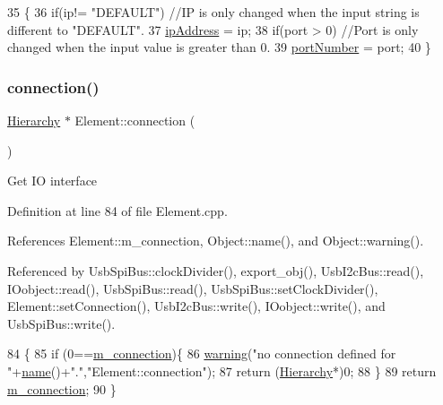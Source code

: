 \begin{DoxyCode}
35 \{
36     \textcolor{keywordflow}{if}(ip!= \textcolor{stringliteral}{"DEFAULT"})                                                              \textcolor{comment}{//IP is only changed
       when the input string is different to "DEFAULT".}
37         \hyperlink{classMSOxxxx_aa55bdb0feb799b195628fe6ef0222b62}{ipAddress} = ip;  
38     \textcolor{keywordflow}{if}(port > 0)                                                                            \textcolor{comment}{//Port is only
       changed when the input value is greater than 0.}
39         \hyperlink{classMSOxxxx_a242bcf72c701cd20d86d25315fc6180f}{portNumber} = port;
40 \}
\end{DoxyCode}
\mbox{\label{classElement_af57444353c1ddf9fa0109801e97debf7}} 
\subsubsection{\texorpdfstring{connection()}{connection()}}
{\footnotesize\ttfamily \hyperlink{classHierarchy}{Hierarchy} $\ast$ Element\+::connection (\begin{DoxyParamCaption}{ }\end{DoxyParamCaption})\hspace{0.3cm}{\ttfamily [inherited]}}

Get IO interface 

Definition at line 84 of file Element.\+cpp.



References Element\+::m\+\_\+connection, Object\+::name(), and Object\+::warning().



Referenced by Usb\+Spi\+Bus\+::clock\+Divider(), export\+\_\+obj(), Usb\+I2c\+Bus\+::read(), I\+Oobject\+::read(), Usb\+Spi\+Bus\+::read(), Usb\+Spi\+Bus\+::set\+Clock\+Divider(), Element\+::set\+Connection(), Usb\+I2c\+Bus\+::write(), I\+Oobject\+::write(), and Usb\+Spi\+Bus\+::write().


\begin{DoxyCode}
84                               \{
85   \textcolor{keywordflow}{if} (0==\hyperlink{classElement_abe3de7a5dbbc9a6dd2d7e012e5fdb266}{m\_connection})\{
86     \hyperlink{classObject_a65cd4fda577711660821fd2cd5a3b4c9}{warning}(\textcolor{stringliteral}{"no connection defined for "}+\hyperlink{classObject_a300f4c05dd468c7bb8b3c968868443c1}{name}()+\textcolor{stringliteral}{"."},\textcolor{stringliteral}{"Element::connection"});
87     \textcolor{keywordflow}{return} (\hyperlink{classHierarchy}{Hierarchy}*)0;
88   \}
89   \textcolor{keywordflow}{return} \hyperlink{classElement_abe3de7a5dbbc9a6dd2d7e012e5fdb266}{m\_connection};
90 \}
\end{DoxyCode}
\mbox{\label{classObject_aac010553f022165573714b7014a15f0d}} 
